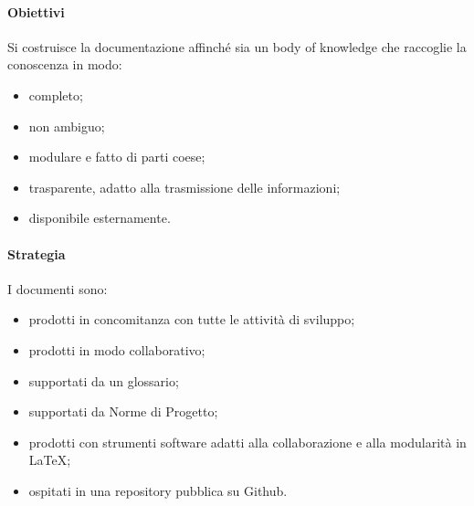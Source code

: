		\paragraph{Obiettivi}
			Si costruisce la documentazione affinché sia un body of knowledge %
			che raccoglie la conoscenza in modo:
			\begin{itemize}
				\item completo;
				\item non ambiguo;
				\item modulare e fatto di parti coese;
				\item trasparente, adatto alla trasmissione delle informazioni;
				\item disponibile esternamente.
			\end{itemize}
		\paragraph{Strategia}
		I documenti sono:
		\begin{itemize}
			\item prodotti in concomitanza con tutte le attività di sviluppo;
			\item prodotti in modo collaborativo;
			\item supportati da un glossario;
			\item supportati da Norme di Progetto;
			\item prodotti con strumenti software adatti alla collaborazione e alla modularità in \LaTeX{};
			\item ospitati in una repository pubblica su Github.
		\end{itemize}

